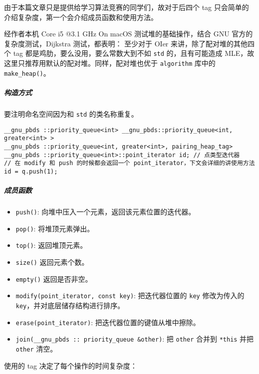 \documentclass[]{article}
\providecommand{\tightlist}{%
  \setlength{\itemsep}{0pt}\setlength{\parskip}{0pt}}
\let\oldsubparagraph\subparagraph
\renewcommand{\subparagraph}[1]{\oldsubparagraph{#1}\mbox{}}
\begin{document}
由于本篇文章只是提供给学习算法竞赛的同学们，故对于后四个 tag
只会简单的介绍复杂度，第一个会介绍成员函数和使用方法。

经作者本机 Core i5 @3.1 GHz On macOS 测试堆的基础操作，结合 GNU
官方的复杂度测试，Dijkstra 测试，都表明： 至少对于 OIer
来讲，除了配对堆的其他四个 tag 都是鸡肋，要么没用，要么常数大到不如
\texttt{std} 的，且有可能造成
MLE，故这里只推荐用默认的配对堆。同样，配对堆也优于 \texttt{algorithm}
库中的 \texttt{make\_heap()}。

\hypertarget{ux6784ux9020ux65b9ux5f0f-1}{%
\subparagraph{构造方式}\label{ux6784ux9020ux65b9ux5f0f-1}}

要注明命名空间因为和 \texttt{std} 的类名称重复。

\begin{verbatim}
__gnu_pbds ::priority_queue<int> __gnu_pbds::priority_queue<int, greater<int> >
__gnu_pbds ::priority_queue<int, greater<int>, pairing_heap_tag>
__gnu_pbds ::priority_queue<int>::point_iterator id; // 点类型迭代器
// 在 modify 和 push 的时候都会返回一个 point_iterator，下文会详细的讲使用方法
id = q.push(1);
\end{verbatim}

\hypertarget{ux6210ux5458ux51fdux6570-1}{%
\subparagraph{成员函数}\label{ux6210ux5458ux51fdux6570-1}}

\begin{itemize}
\tightlist
\item
  \texttt{push()}: 向堆中压入一个元素，返回该元素位置的迭代器。
\item
  \texttt{pop()}: 将堆顶元素弹出。
\item
  \texttt{top()}: 返回堆顶元素。
\item
  \texttt{size()} 返回元素个数。
\item
  \texttt{empty()} 返回是否非空。
\item
  \texttt{modify(point\_iterator,\ const\ key)}: 把迭代器位置的
  \texttt{key} 修改为传入的 \texttt{key}，并对底层储存结构进行排序。
\item
  \texttt{erase(point\_iterator)}: 把迭代器位置的键值从堆中擦除。
\item
  \texttt{join(\_\_gnu\_pbds\ ::\ priority\_queue\ \&other)}: 把
  \texttt{other} 合并到 \texttt{*this} 并把 \texttt{other} 清空。
\end{itemize}

使用的 tag 决定了每个操作的时间复杂度：
\end{document}
